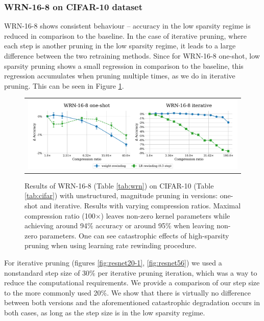\subsubsection{WRN-16-8 on CIFAR-10 dataset}
\nopagebreak

WRN-16-8 shows consistent behaviour -- accuracy in the low sparsity regime is reduced in comparison to the baseline. In the case of iterative pruning, where each step is another pruning in the low sparsity regime, it leads to a large difference between the two retraining methods. Since for WRN-16-8 one-shot, low sparsity pruning shows a small regression in comparison to the baseline, this regression accumulates when pruning multiple times, as we do in iterative pruning. This can be seen in Figure \ref{fig:wrn-1}.

\begin{figure}[H]
\setlength{\tabcolsep}{0pt}
  \begin{center}
    \begin{tabular}{c}
      \includegraphics[width=1.0\linewidth]{pics/WRN-16-8-LR-rewinding-is-flawed2.pdf}\\
    \end{tabular}
  \end{center}
\caption{Results of WRN-16-8 (Table \ref{tab:wrn}) on CIFAR-10 (Table \ref{tab:cifar}) with unstructured, magnitude pruning in versions: one-shot and iterative. Results with varying compression ratios. Maximal compression ratio (100$\times$) leaves  non-zero kernel parameters while achieving around 94\% accuracy or around 95\% when leaving  non-zero parameters. One can see catastrophic effects of high-sparsity pruning when using learning rate rewinding procedure.}
\label{fig:wrn-1}
\end{figure}

For iterative pruning (figures \ref{fig:resnet20-1}, \ref{fig:resnet56}) we used a nonstandard step size of 30\% per iterative pruning iteration, which was a way to reduce the computational requirements. We provide a comparison of our step size to the more commonly used 20\%. We show that there is virtually no difference between both versions and the aforementioned catastrophic degradation occurs in both cases, as long as the step size is in the low sparsity regime.

